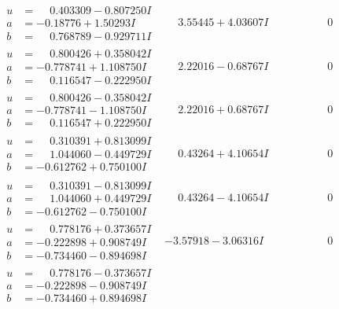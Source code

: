 \documentclass[1p]{elsarticle_modified}
\theoremstyle{definition}
\begin{document}
$$\begin{array}{c|c|c}
\begin{aligned}
u &= \phantom{-}0.403309 - 0.807250 I \\
a &= -0.18776 + 1.50293 I \\
b &= \phantom{-}0.768789 - 0.929711 I\end{aligned}
 & \phantom{-}3.55445 + 4.03607 I & \phantom{-0.000000 } 0 \\ \hline\begin{aligned}
u &= \phantom{-}0.800426 + 0.358042 I \\
a &= -0.778741 + 1.108750 I \\
b &= \phantom{-}0.116547 - 0.222950 I\end{aligned}
 & \phantom{-}2.22016 - 0.68767 I & \phantom{-0.000000 } 0 \\ \hline\begin{aligned}
u &= \phantom{-}0.800426 - 0.358042 I \\
a &= -0.778741 - 1.108750 I \\
b &= \phantom{-}0.116547 + 0.222950 I\end{aligned}
 & \phantom{-}2.22016 + 0.68767 I & \phantom{-0.000000 } 0 \\ \hline\begin{aligned}
u &= \phantom{-}0.310391 + 0.813099 I \\
a &= \phantom{-}1.044060 - 0.449729 I \\
b &= -0.612762 + 0.750100 I\end{aligned}
 & \phantom{-}0.43264 + 4.10654 I & \phantom{-0.000000 } 0 \\ \hline\begin{aligned}
u &= \phantom{-}0.310391 - 0.813099 I \\
a &= \phantom{-}1.044060 + 0.449729 I \\
b &= -0.612762 - 0.750100 I\end{aligned}
 & \phantom{-}0.43264 - 4.10654 I & \phantom{-0.000000 } 0 \\ \hline\begin{aligned}
u &= \phantom{-}0.778176 + 0.373657 I \\
a &= -0.222898 + 0.908749 I \\
b &= -0.734460 - 0.894698 I\end{aligned}
 & -3.57918 - 3.06316 I & \phantom{-0.000000 } 0 \\ \hline\begin{aligned}
u &= \phantom{-}0.778176 - 0.373657 I \\
a &= -0.222898 - 0.908749 I \\
b &= -0.734460 + 0.894698 I\end{aligned}

\end{array}$$
\end{document}
